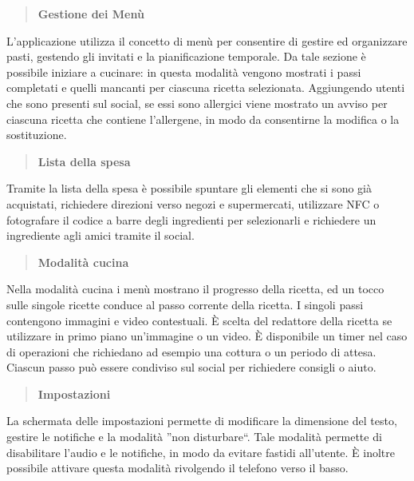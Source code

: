 \begin{quote}
 \textbf{Gestione dei Menù}
\end{quote}
L'applicazione utilizza il concetto di menù per consentire di gestire ed organizzare pasti, gestendo gli 
invitati e la pianificazione temporale. Da tale sezione è possibile iniziare a cucinare: in questa modalità vengono
mostrati i passi completati e quelli mancanti per ciascuna ricetta selezionata. Aggiungendo utenti che sono presenti
sul social, se essi sono allergici viene mostrato un avviso per ciascuna ricetta che contiene l'allergene, in modo da consentirne
la modifica o la sostituzione.

\begin{quote}
 \textbf{Lista della spesa}
\end{quote}
Tramite la lista della spesa è possibile spuntare gli elementi che si sono già acquistati, richiedere direzioni verso negozi e supermercati,
utilizzare NFC o fotografare il codice a barre degli ingredienti per selezionarli e richiedere un ingrediente agli amici tramite il social.

\begin{quote}
 \textbf{Modalità cucina}
\end{quote}
Nella modalità cucina i menù mostrano il progresso della ricetta, ed un tocco sulle singole ricette conduce al passo corrente della ricetta. I singoli passi
contengono immagini e video contestuali. È scelta del redattore della ricetta se utilizzare in primo piano un'immagine o un video. È disponibile un timer
nel caso di operazioni che richiedano ad esempio una cottura o un periodo di attesa. Ciascun passo può essere condiviso sul social per richiedere consigli o aiuto.

\begin{quote}
 \textbf{Impostazioni}
\end{quote}
La schermata delle impostazioni permette di modificare la dimensione del testo, gestire le notifiche e la modalità ''non disturbare``. Tale modalità permette
di disabilitare l'audio e le notifiche, in modo da evitare fastidi all'utente. È inoltre possibile attivare questa modalità rivolgendo il telefono verso il basso.

